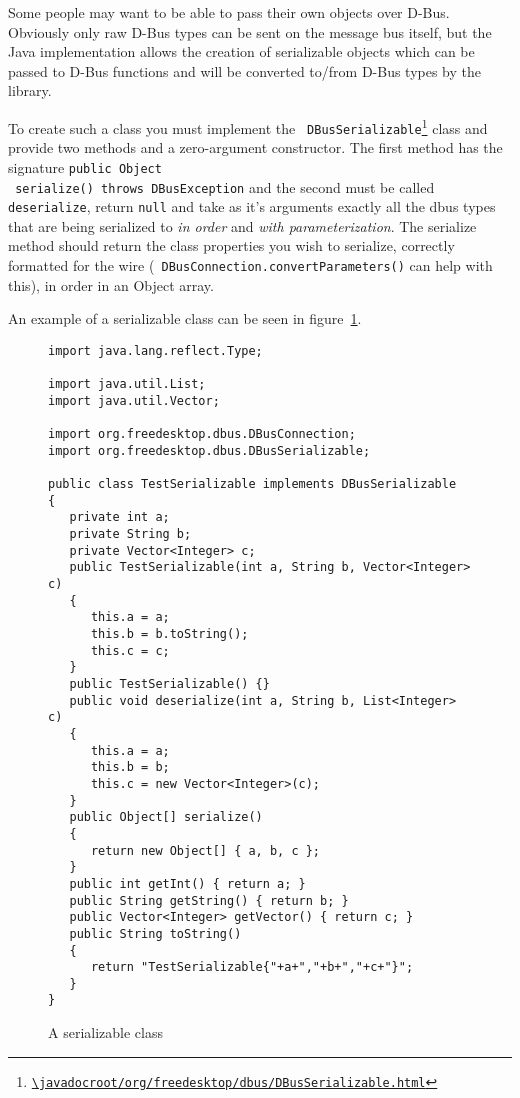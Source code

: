 \documentclass[a4paper,12pt]{article}
\begin{document}
Some people may want to be able to pass their own objects over D-Bus. Obviously
only raw D-Bus types can be sent on the message bus itself, but the Java
implementation allows the creation of serializable objects which can be passed to
D-Bus functions and will be converted to/from D-Bus types by the library.

To create such a class you must implement the {\tt
DBusSerializable\footnote{\url{\javadocroot/org/freedesktop/dbus/DBusSerializable.html}}}
class and provide two methods and a zero-argument constructor. The first method
has the signature {\tt public Object\[\] serialize() throws DBusException} and
the second must be called {\tt deserialize}, return {\tt null} and take as it's
arguments exactly all the dbus types that are being serialized to {\em in
order} and {\em with parameterization}. The serialize method should return the
class properties you wish to serialize, correctly formatted for the wire ({\tt
DBusConnection.convertParameters()} can help with this), in order in an Object
array.

An example of a serializable class can be seen in figure~\ref{fig:serializable}.


\begin{figure}[htb]
\begin{center}
\begin{verbatim}
import java.lang.reflect.Type;

import java.util.List;
import java.util.Vector;

import org.freedesktop.dbus.DBusConnection;
import org.freedesktop.dbus.DBusSerializable;

public class TestSerializable implements DBusSerializable
{
   private int a;
   private String b;
   private Vector<Integer> c;
   public TestSerializable(int a, String b, Vector<Integer> c)
   {
      this.a = a;
      this.b = b.toString();
      this.c = c;
   }
   public TestSerializable() {}
   public void deserialize(int a, String b, List<Integer> c)
   {
      this.a = a;
      this.b = b;
      this.c = new Vector<Integer>(c);
   }
   public Object[] serialize() 
   {
      return new Object[] { a, b, c };
   }
   public int getInt() { return a; }
   public String getString() { return b; }
   public Vector<Integer> getVector() { return c; }
   public String toString()
   {
      return "TestSerializable{"+a+","+b+","+c+"}";
   }
}
\end{verbatim}
\end{center}
\caption{A serializable class}
\label{fig:serializable}
\end{figure}
\end{document}
